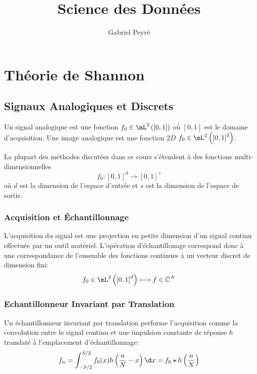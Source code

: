 \documentclass{cours}
\title{Science des Données}
\author{Gabriel Peyré}
\begin{document}
\bettertitle

\section{Théorie de Shannon}
\subsection{Signaux Analogiques et Discrets}
\begin{definition}
	Un signal analogique est une fonction $f_{0}\in \mL^{2}\left(\left[0, 1\right]\right)$ où $[0, 1]$ est le domaine d'acquisition.
	Une image analogique est une fonction $2D$ $f_{0}\in \mL^{2}\left(\left[0, 1\right]^{2}\right)$.
	\label{def:signal_analogique}
\end{definition}

La plupart des méthodes discutées dans ce cours s'étendent à des fonctions multi-dimensionnelles
\begin{equation*}
	f_{0}: \left[0, 1\right]^{d}\longrightarrow \left[0, 1\right]^{s}
\end{equation*}
où $d$ est la dimension de l'espace d'entrée et $s$ est la dimension de l'espace de sortie.

\subsubsection{Acquisition et Échantillonnage}
\begin{definition}
	L'acquisition du signal est une projection en petite dimension d'un signal continu effectuée par un outil matériel.
	L'opération d'échantillonage correspond donc à une correspondance de l'ensemble des fonctions continues à un vecteur discret de dimension fini:
	\begin{equation*}
		f_{0}\in\mL^{2}\left(\left[0, 1\right]^{d}\right) \longmapsto f\in \C^{N}
	\end{equation*}
	\label{def:acquisition_signal}
\end{definition}

\subsubsection{Echantillonneur Invariant par Translation}
\begin{definition}
	Un échantillonneur invariant par translation performe l'acquisition comme la convolution entre le signal continu et une impulsion constante de réponse $h$ translaté à l'emplacement d'échantillonnage:
	\begin{equation}
		f_{n} = \int_{-S/2}^{S/2}f_{0}(x)h\left(\frac{n}{N} - x\right)\d x = f_{0}\star h\left(\frac{n}{N}\right)
	\end{equation}
	\label{def:ltis}
\end{definition}
\end{document}
